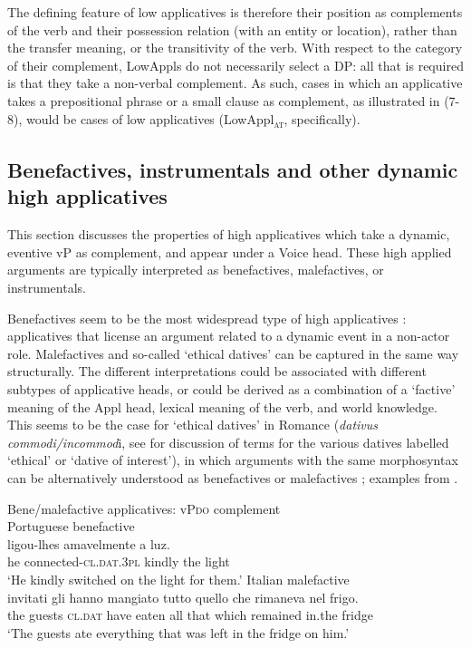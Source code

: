 \documentclass[output=paper,colorlinks,citecolor=brown,nonflat]{./langscibook}
\begin{document}
The defining feature of low applicatives is therefore their position as complements of the verb and their possession relation (with an entity or location), rather than the transfer meaning, or the transitivity of the verb. With respect to the category of their complement, LowAppls do not necessarily select a DP: all that is required is that they take a non-verbal complement. As such, cases in which an applicative takes a prepositional phrase or a small clause as complement, as illustrated in (7-8), would be cases of low applicatives (LowAppl\textsc{\textsubscript{at}}, specifically).

\subsection{Benefactives, instrumentals and other dynamic high applicatives}\label{sec:cuervo:4.2}

This section discusses the properties of high applicatives which take a dynamic, eventive vP as complement, and appear under a Voice head. These high applied arguments are typically interpreted as benefactives, malefactives, or instrumentals. 

Benefactives seem to be the most widespread type of high applicatives \citep{Polinsky2013}: applicatives that license an argument related to a dynamic event in a non-actor role. Malefactives and so-called ‘ethical datives’ can be captured in the same way structurally. The different interpretations could be associated with different subtypes of applicative heads, or could be derived as a combination of a ‘factive’ meaning of the Appl head, lexical meaning of the verb, and world knowledge. This seems to be the case for ‘ethical datives’ in Romance (\textit{dativus commodi/incommod}i, see \citealt{RobergeTroberg2009} for discussion of terms for the various datives labelled ‘ethical’ or ‘dative of interest’), in which arguments with the same morphosyntax can be alternatively understood as benefactives  or malefactives ; examples from \citealt{RobergeTroberg2009}.

\ea%
    \label{ex:cuervo:9}
    Bene/malefactive applicatives: vP\textsc{do} complement\\
    \ea%
        \label{ex:cuervo:9a}
        Portuguese benefactive\\
         {ligou-lhes}   {amavelmente} {a} {luz}.\\
        he   connected-\textsc{cl.dat.3pl} kindly   the light\\
        \glt ‘He kindly switched on the light for them.’
    \ex%
        \label{ex:cuervo:9b}
        Italian malefactive\\
         {invitati} {gli} {hanno} {mangiato} {tutto} {quello} {che} {rimaneva} {nel} {frigo}.\\
         the guests  \textsc{cl.dat}  have eaten all that which remained in.the fridge\\
        \glt ‘The guests ate everything that was left in the fridge on him.’
    \z
\z
\end{document}
